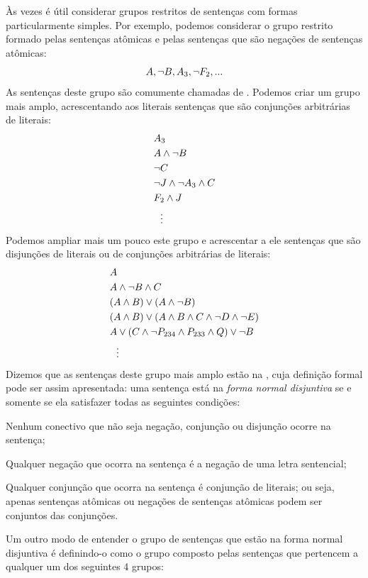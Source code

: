 Às vezes é útil considerar grupos restritos de sentenças com formas particularmente simples.
Por exemplo, podemos considerar o grupo restrito formado pelas sentenças atômicas e pelas sentenças que são negações de sentenças atômicas:
$$A, \neg B, A_3, \neg F_2, ...$$
As sentenças deste grupo  são comumente chamadas de .
Podemos criar um grupo mais amplo, acrescentando aos literais sentenças que são conjunções arbitrárias de literais:
	\begin{align*}
			& A_3 \\
			& A \wedge \neg B \\
			& \neg C \\
			& \neg J \wedge \neg A_3 \wedge  C \\
			& F_2 \wedge  J \\
			& \ \ \vdots
	\end{align*}
Podemos ampliar mais um pouco este grupo e acrescentar a ele sentenças que são disjunções de literais ou de conjunções arbitrárias de literais:
	\begin{align*}
  		& A \\
  		& A \wedge \lnot B \wedge C\\
  		& (A \wedge B) \vee (A \wedge \neg B)\\
  		& (A \wedge B) \vee (A \wedge  B \wedge C \wedge \neg D \wedge \neg E)\\
  		& A \vee (C \wedge \neg P_{234} \wedge P_{233} \wedge Q) \vee \neg B\\
  		& \ \ \vdots
	\end{align*}
Dizemos que as sentenças deste grupo mais amplo estão na , cuja definição formal pode ser assim apresentada:
uma sentença está na \textit{forma normal disjuntiva} se e somente se ela satisfazer todas as seguintes condições:
	\begin{earg}
		\item[(\textsc{fnd 1})] Nenhum conectivo que não seja negação, conjunção ou disjunção ocorre na sentença;
		\item[(\textsc{fnd 2})] Qualquer negação que ocorra na sentença é a negação de uma letra sentencial;
		\item[(\textsc{fnd 3})] Qualquer conjunção que ocorra na sentença é conjunção de literais; ou seja, apenas sentenças atômicas ou negações de sentenças atômicas podem ser conjuntos das conjunções.
	\end{earg}
Um outro modo de entender o grupo de sentenças que estão na forma normal disjuntiva é definindo-o como o grupo composto pelas sentenças que pertencem a qualquer um dos seguintes 4 grupos:
